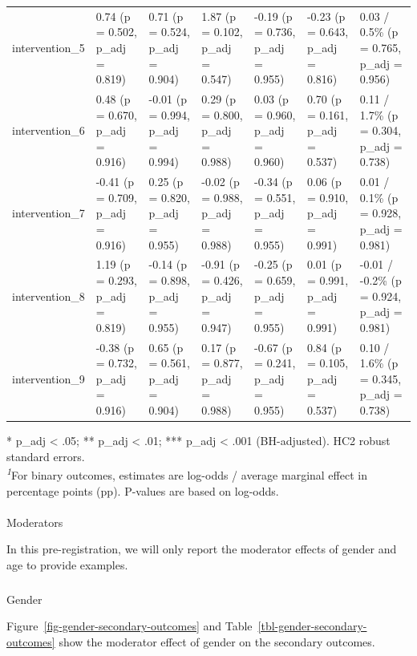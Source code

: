 \documentclass[
  letterpaper,
  DIV=11,
  numbers=noendperiod]{scrartcl}
\makeatletter
\let\oldparagraph\paragraph
\renewcommand{\paragraph}{
    \@ifstar
      \xxxParagraphStar
      \xxxParagraphNoStar
  }
\newcommand{\xxxParagraphStar}[1]{\oldparagraph*{#1}\mbox{}}
\newcommand{\xxxParagraphNoStar}[1]{\oldparagraph{#1}\mbox{}}
\let\oldsubparagraph\subparagraph
\renewcommand{\subparagraph}{
    \@ifstar
      \xxxSubParagraphStar
      \xxxSubParagraphNoStar
  }
\newcommand{\xxxSubParagraphStar}[1]{\oldsubparagraph*{#1}\mbox{}}
\newcommand{\xxxSubParagraphNoStar}[1]{\oldsubparagraph{#1}\mbox{}}
\makeatother
\begin{document}
\begin{longtable}{l|llllll}
intervention\_5 & {0.74 (p = 0.502, p\_adj = 0.819)} & {0.71 (p = 0.524, p\_adj = 0.904)} & {1.87 (p = 0.102, p\_adj = 0.547)} & {-0.19 (p = 0.736, p\_adj = 0.955)} & {-0.23 (p = 0.643, p\_adj = 0.816)} & {0.03 / 0.5\% (p = 0.765, p\_adj = 0.956)} \\ 
intervention\_6 & {0.48 (p = 0.670, p\_adj = 0.916)} & {-0.01 (p = 0.994, p\_adj = 0.994)} & {0.29 (p = 0.800, p\_adj = 0.988)} & {0.03 (p = 0.960, p\_adj = 0.960)} & {0.70 (p = 0.161, p\_adj = 0.537)} & {0.11 / 1.7\% (p = 0.304, p\_adj = 0.738)} \\ 
intervention\_7 & {-0.41 (p = 0.709, p\_adj = 0.916)} & {0.25 (p = 0.820, p\_adj = 0.955)} & {-0.02 (p = 0.988, p\_adj = 0.988)} & {-0.34 (p = 0.551, p\_adj = 0.955)} & {0.06 (p = 0.910, p\_adj = 0.991)} & {0.01 / 0.1\% (p = 0.928, p\_adj = 0.981)} \\ 
intervention\_8 & {1.19 (p = 0.293, p\_adj = 0.819)} & {-0.14 (p = 0.898, p\_adj = 0.955)} & {-0.91 (p = 0.426, p\_adj = 0.947)} & {-0.25 (p = 0.659, p\_adj = 0.955)} & {0.01 (p = 0.991, p\_adj = 0.991)} & {-0.01 / -0.2\% (p = 0.924, p\_adj = 0.981)} \\ 
intervention\_9 & {-0.38 (p = 0.732, p\_adj = 0.916)} & {0.65 (p = 0.561, p\_adj = 0.904)} & {0.17 (p = 0.877, p\_adj = 0.988)} & {-0.67 (p = 0.241, p\_adj = 0.955)} & {0.84 (p = 0.105, p\_adj = 0.537)} & {0.10 / 1.6\% (p = 0.345, p\_adj = 0.738)} \\ 
\bottomrule

\end{longtable}

\begin{minipage}{\linewidth}
* p\_adj < .05; ** p\_adj < .01; *** p\_adj < .001 (BH-adjusted). HC2 robust standard errors.\\
\textsuperscript{\textit{1}}For binary outcomes, estimates are log-odds / average marginal effect in percentage points (pp). P-values are based on log-odds.\\
\end{minipage}
\endgroup

\paragraph{Moderators}\label{moderators-2}

In this pre-registration, we will only report the moderator effects of
gender and age to provide examples.

\subparagraph{Gender}\label{gender-1}

Figure~\ref{fig-gender-secondary-outcomes} and
Table~\ref{tbl-gender-secondary-outcomes} show the moderator effect of
gender on the secondary outcomes.
\end{document}
